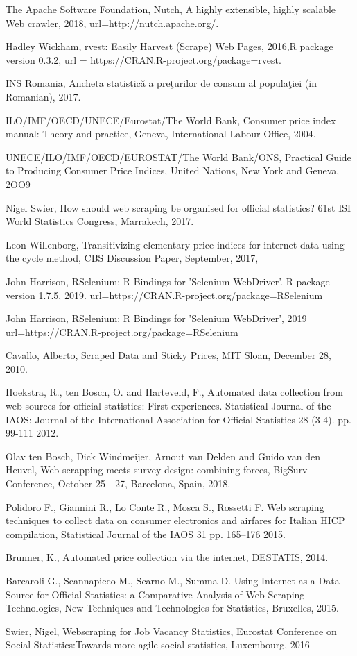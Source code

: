 \documentclass[]{article}
\begin{document}
\begin{thebibliography}{99}
The Apache Software Foundation,
Nutch, A highly extensible, highly scalable Web crawler, 2018,
url={http://nutch.apache.org/}.

Hadley Wickham,
rvest: Easily Harvest (Scrape) Web Pages,
2016,{R package version 0.3.2},
url = {https://CRAN.R-project.org/package=rvest}.


INS Romania, Ancheta statistică a preţurilor de consum al populaţiei (in Romanian),
2017.

ILO/IMF/OECD/UNECE/Eurostat/The World Bank,
Consumer price index manual: Theory and practice,
Geneva, International Labour Office, 2004.

UNECE/ILO/IMF/OECD/EUROSTAT/The World Bank/ONS, 
Practical Guide to Producing Consumer Price Indices, 
United Nations, New York and Geneva, 2OO9


Nigel Swier, 
How should web scraping be organised for official statistics? 
61st ISI World Statistics Congress, Marrakech, 2017.


Leon Willenborg,
Transitivizing elementary price indices for internet data using the cycle method,
CBS Discussion Paper, September, 2017,


John Harrison, 
RSelenium: R Bindings for 'Selenium WebDriver'. R package version 1.7.5, 2019.
url={https://CRAN.R-project.org/package=RSelenium}

John Harrison,
RSelenium: R Bindings for 'Selenium WebDriver', 2019
url={https://CRAN.R-project.org/package=RSelenium}


Cavallo, Alberto, Scraped Data and Sticky Prices, 
MIT Sloan, 
December 28, 2010.


Hoekstra, R., ten Bosch, O. and Harteveld, F., 
Automated data collection from web sources for official statistics: First experiences. 
Statistical Journal of the IAOS: Journal of the International Association for Official Statistics 28 (3-4). pp. 99-111
2012.

Olav ten Bosch, Dick Windmeijer, Arnout van Delden and Guido van den Heuvel,
Web scrapping meets survey design: combining forces,
BigSurv Conference, October 25 - 27, Barcelona, Spain,
2018.


Polidoro F., Giannini R., Lo Conte R., Mosca S., Rossetti F. 
Web scraping techniques to collect data on consumer electronics and airfares for Italian HICP compilation,
Statistical Journal of the IAOS 31 pp. 165–176
2015.

Brunner, K., 
Automated price collection via the internet, 
DESTATIS, 2014.

Barcaroli G., Scannapieco M., Scarno M., Summa D. 
Using Internet as a Data Source for Official Statistics: a Comparative Analysis of Web Scraping Technologies,
New Techniques and Technologies for Statistics, Bruxelles, 2015.

Swier, Nigel, 
Webscraping for Job Vacancy Statistics, 
Eurostat Conference on Social Statistics:Towards more agile social statistics, Luxembourg,
2016
\end{thebibliography}
\end{document}
